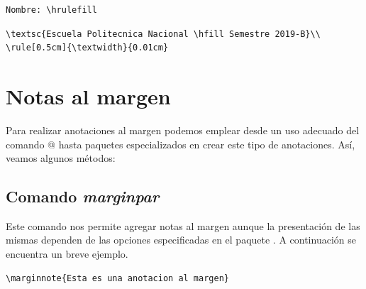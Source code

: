 \documentclass[a4,10pt]{aleph-notas}
\begin{document}
\begin{lstlisting}[frame=single]
 Nombre: \hrulefill
\end{lstlisting}

\begin{center}
{ \fboxsep 12pt
 }
\end{center}

\vspace{12pt}

\begin{lstlisting}[frame=single]
 \textsc{Escuela Politecnica Nacional \hfill Semestre 2019-B}\\
\rule[0.5cm]{\textwidth}{0.01cm}
\end{lstlisting}

\begin{center}
{ \fboxsep 12pt
 }
\end{center}



\section{Notas al margen}

Para realizar anotaciones al margen podemos emplear desde un uso adecuado del comando \verb@\hspace{}@ hasta paquetes especializados en crear este tipo de anotaciones. Así, veamos algunos métodos:

\subsection{Comando \emph{marginpar}}

Este comando nos permite agregar notas al margen aunque la presentación de las mismas dependen de las opciones especificadas en el paquete \verb@geometry@. A continuación se encuentra un breve ejemplo.

\bigskip


\begin{lstlisting}[frame=single]
    \marginnote{Esta es una anotacion al margen}
\end{lstlisting}
\end{document}
